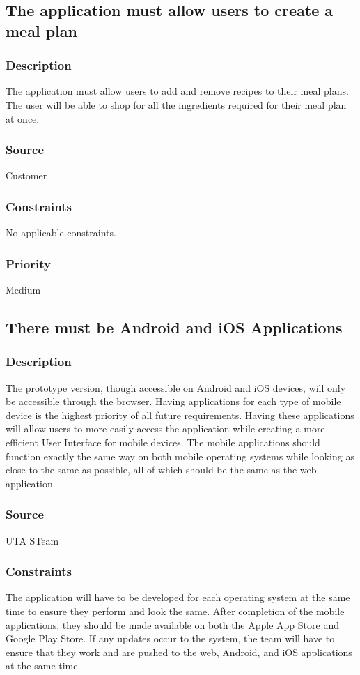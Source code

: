 \subsection{The application must allow users to create a meal plan}
\subsubsection{Description}
The application must allow users to add and remove recipes to their meal plans. The user will be able to shop for all the ingredients required for their meal plan at once.
\subsubsection{Source}
Customer
\subsubsection{Constraints}
No applicable constraints.
\subsubsection{Priority}
Medium
\subsection{There must be Android and iOS Applications}
\subsubsection{Description}
The prototype version, though accessible on Android and iOS devices, will only be accessible through the browser. Having applications for each type of mobile device is the highest priority of all future requirements. Having these applications will allow users to more easily access the application while creating a more efficient User Interface for mobile devices. The mobile applications should function exactly the same way on both mobile operating systems while looking as close to the same as possible, all of which should be the same as the web application.
\subsubsection{Source}
UTA STeam
\subsubsection{Constraints}
The application will have to be developed for each operating system at the same time to ensure they perform and look the same. After completion of the mobile applications, they should be made available on both the Apple App Store and Google Play Store. If any updates occur to the system, the team will have to ensure that they work and are pushed to the web, Android, and iOS applications at the same time.
